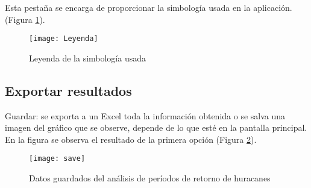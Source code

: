 Esta pestaña se encarga de proporcionar la simbología usada en la aplicación. (Figura \ref{fig:Leyenda}).


\begin{figure}[H]
\centering
\texttt{[image: Leyenda]}
\caption{Leyenda de la simbología usada }
\label{fig:Leyenda}
\end{figure}

\pagebreak


\subsection{Exportar resultados}

Guardar: se exporta a un Excel toda la información obtenida o se salva una imagen del gráfico que se observe, depende de lo que esté en la pantalla principal. En la figura se observa el resultado de la primera opción (Figura \ref{fig:save}).


\begin{figure}[H]
\centering
\texttt{[image: save]}
\caption{Datos guardados del análisis de períodos de retorno de huracanes }
\label{fig:save}
\end{figure}


























